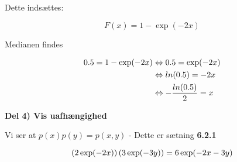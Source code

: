 Dette indsættes:

\begin{equation}
    F(x) =  1 - \exp(-2x)
\end{equation}

Medianen findes

\begin{align}
    0.5 = 1 - \exp(-2x)  
    &\Leftrightarrow 0.5 = \exp(-2x) \\
    &\Leftrightarrow ln(0.5) = -2x \\
    &\Leftrightarrow -\frac{ln(0.5)}{2} = x
\end{align}

\textbf{Del 4) Vis uafhængighed}

Vi ser at $p(x)p(y) = p(x,y)$ -  Dette er sætning \textbf{6.2.1}

\begin{equation}
    \left( 2 \exp(-2x) \right) \left( 3 \exp(-3y )\right) = 6 \exp(-2x - 3y)
\end{equation}
